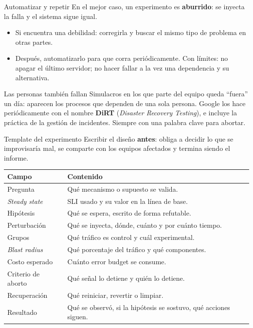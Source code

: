 \documentclass[institutional,screen,none]{ua-engineering-v6-beamer}
\begin{document}
\begin{frame}{Automatizar y repetir}
En el mejor caso, un experimento es \textbf{aburrido}: se inyecta la falla y el sistema sigue igual.

\pause

\begin{itemize}
\item Si encuentra una debilidad: corregirla y buscar el mismo tipo de problema en otras partes.
\item Después, automatizarlo para que corra periódicamente. Con límites: no apagar el último servidor; no hacer fallar a la vez una dependencia y su alternativa.
\end{itemize}

\pause

\begin{block}{Las personas también fallan}
Simulacros en los que parte del equipo queda ``fuera'' un día: aparecen los procesos que dependen de una sola persona. Google los hace periódicamente con el nombre \textbf{DiRT} (\emph{Disaster Recovery Testing}), e incluye la práctica de la gestión de incidentes. Siempre con una palabra clave para abortar.
\end{block}
\end{frame}

\begin{frame}{Template del experimento}
Escribir el diseño \textbf{antes}: obliga a decidir lo que se improvisaría mal, se comparte con los equipos afectados y termina siendo el informe.

\begin{center}
\scriptsize
\begin{tabular}{p{}p{}}
\toprule
\textbf{Campo} & \textbf{Contenido} \\
\midrule
Pregunta & Qué mecanismo o supuesto se valida. \\
\emph{Steady state} & SLI usado y su valor en la línea de base. \\
Hipótesis & Qué se espera, escrito de forma refutable. \\
Perturbación & Qué se inyecta, dónde, cuánto y por cuánto tiempo. \\
Grupos & Qué tráfico es control y cuál experimental. \\
\emph{Blast radius} & Qué porcentaje del tráfico y qué componentes. \\
Costo esperado & Cuánto error budget se consume. \\
Criterio de aborto & Qué señal lo detiene y quién lo detiene. \\
Recuperación & Qué reiniciar, revertir o limpiar. \\
Resultado & Qué se observó, si la hipótesis se sostuvo, qué acciones siguen. \\
\bottomrule
\end{tabular}
\end{center}
\end{frame}
\end{document}
